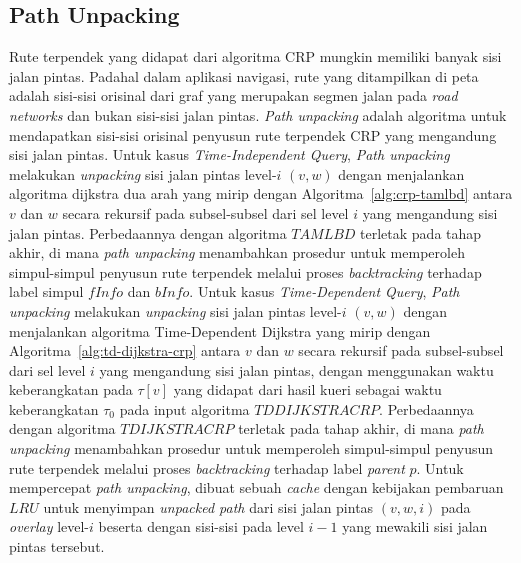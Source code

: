 \subsection{Path Unpacking}
\label{subsec:tdcrp-path-unpacking}
Rute terpendek yang didapat dari algoritma CRP mungkin memiliki banyak sisi jalan pintas. Padahal dalam aplikasi navigasi, rute yang ditampilkan di peta adalah sisi-sisi orisinal dari graf yang merupakan segmen jalan pada \textit{road networks} dan bukan sisi-sisi jalan pintas. \textit{Path unpacking} adalah algoritma untuk mendapatkan sisi-sisi orisinal penyusun rute terpendek CRP yang mengandung sisi jalan pintas. Untuk kasus \textit{Time-Independent Query}, \textit{Path unpacking} melakukan \textit{unpacking} sisi jalan pintas level-$i$ $(v,w)$ dengan menjalankan algoritma dijkstra dua arah yang mirip dengan Algoritma~\ref{alg:crp-tamlbd} antara $v$ dan $w$ secara rekursif pada subsel-subsel dari sel level $i$ yang mengandung sisi jalan pintas. Perbedaannya dengan algoritma $TAMLBD$ terletak pada tahap akhir, di mana \textit{path unpacking} menambahkan prosedur untuk memperoleh simpul-simpul penyusun rute terpendek melalui proses \textit{backtracking} terhadap label simpul $fInfo$ dan $bInfo$. Untuk kasus \textit{Time-Dependent Query}, \textit{Path unpacking} melakukan \textit{unpacking} sisi jalan pintas level-$i$ $(v,w)$ dengan menjalankan algoritma Time-Dependent Dijkstra yang mirip dengan Algoritma~\ref{alg:td-dijkstra-crp} antara $v$ dan $w$ secara rekursif pada subsel-subsel dari sel level $i$ yang mengandung sisi jalan pintas, dengan menggunakan waktu keberangkatan pada $\tau[v]$ yang didapat dari hasil kueri sebagai waktu keberangkatan $\tau_0$ pada input algoritma $TDDIJKSTRACRP$. Perbedaannya dengan algoritma $TDIJKSTRACRP$ terletak pada tahap akhir, di mana \textit{path unpacking} menambahkan prosedur untuk memperoleh simpul-simpul penyusun rute terpendek melalui proses \textit{backtracking} terhadap label \textit{parent} $p$. Untuk mempercepat \textit{path unpacking}, dibuat sebuah \textit{cache} dengan kebijakan pembaruan $LRU$ untuk menyimpan \textit{unpacked path} dari sisi jalan pintas $(v,w,i)$ pada \textit{overlay} level-$i$ beserta dengan sisi-sisi pada level $i-1$ yang mewakili sisi jalan pintas tersebut.



